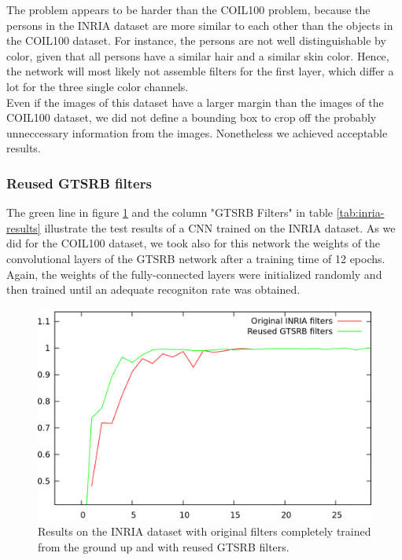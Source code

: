 \documentclass[11pt, a4paper]{article}
\begin{document}
The problem appears to be harder than the COIL100 problem, because the persons in the INRIA dataset are more similar to each other than the objects in the COIL100 dataset. For instance, the persons are not well distinguishable by color, given that all persons have a similar hair and a similar skin color. Hence, the network will most likely not assemble filters for the first layer, which differ a lot for the three single color channels.\\
Even if the images of this dataset have a larger margin than the images of the COIL100 dataset, we did not define a bounding box to crop off the probably unneccessary information from the images. Nonetheless we achieved acceptable results.

\subsubsection{Reused GTSRB filters}

The green line in figure \ref{fig:inria_results} and the column "GTSRB Filters" in table \ref{tab:inria-results} illustrate the test results of a CNN trained on the INRIA dataset. As we did for the COIL100 dataset, we took also for this network the weights of the convolutional layers of the GTSRB network after a training time of 12 epochs. Again, the weights of the fully-connected layers were initialized randomly and then trained until an adequate recogniton rate was obtained.

\begin{figure}[h!]
	\centering
	\includegraphics[width=1\textwidth]{inria_results.png}
	\caption{Results on the INRIA dataset with original filters completely trained from the ground up and with reused GTSRB filters.}
	\label{fig:inria_results}
\end{figure}
\end{document}
